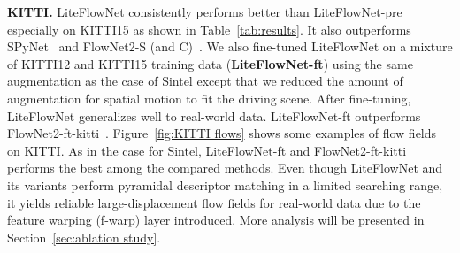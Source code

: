\documentclass[10pt,twocolumn,letterpaper]{article}
\begin{document}
\vspace{0.1cm}
\noindent
\textbf{KITTI.} LiteFlowNet consistently performs better than LiteFlowNet-pre especially on KITTI15  as shown in Table~\ref{tab:results}. It also outperforms SPyNet~\cite{Ranjan17} and FlowNet2-S (and C)~\cite{Ilg17}. 
%
We also fine-tuned LiteFlowNet on a mixture of KITTI12 and KITTI15 training data (\textbf{LiteFlowNet-ft}) using the same augmentation as the case of Sintel except that we reduced the amount of augmentation for spatial motion to fit the driving scene. After fine-tuning, LiteFlowNet generalizes well to real-world data. LiteFlowNet-ft outperforms FlowNet2-ft-kitti~\cite{Ilg17}. Figure~\ref{fig:KITTI flows} shows some examples of flow fields on KITTI. As in the case for Sintel, LiteFlowNet-ft and FlowNet2-ft-kitti performs the best among the compared methods. Even though LiteFlowNet and its variants perform pyramidal descriptor matching in a limited searching range, it yields reliable large-displacement flow fields for real-world data due to the feature warping (f-warp) layer introduced. More analysis will be presented in Section~\ref{sec:ablation study}.
\end{document}
